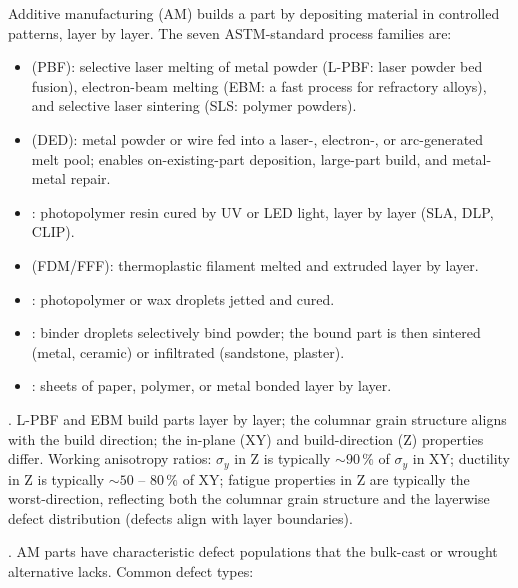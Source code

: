 Additive manufacturing (AM) builds a part by depositing material in
controlled patterns, layer by layer. The seven ASTM-standard process
families \cite[ch.~3]{text:gibson-rosen-stucker-am} are:

\begin{itemize}[leftmargin=*]
\item {} (PBF): selective laser melting of
  metal powder (L-PBF: laser powder bed fusion), electron-beam
  melting (EBM: a fast process for refractory alloys), and selective
  laser sintering (SLS: polymer powders).
\item {} (DED): metal powder or
  wire fed into a laser-, electron-, or arc-generated melt pool;
  enables on-existing-part deposition, large-part build, and metal-
  metal repair.
\item {}: photopolymer resin cured by
  UV or LED light, layer by layer (SLA, DLP, CLIP).
\item {} (FDM/FFF): thermoplastic filament
  melted and extruded layer by layer.
\item {}: photopolymer or wax droplets jetted
  and cured.
\item {}: binder droplets selectively bind
  powder; the bound part is then sintered (metal, ceramic) or
  infiltrated (sandstone, plaster).
\item {}: sheets of paper, polymer, or
  metal bonded layer by layer.
\end{itemize}

. L-PBF and
EBM build parts layer by layer; the columnar grain structure aligns
with the build direction; the in-plane (XY) and build-direction (Z)
properties differ. Working anisotropy ratios: $\sigma_y$ in Z is
typically $\sim 90\,\%$ of $\sigma_y$ in XY; ductility in Z is
typically $\sim 50$ -- $80\,\%$ of XY; fatigue properties in Z are
typically the worst-direction, reflecting both the columnar grain
structure and the layerwise defect distribution (defects align with
layer boundaries).

. AM parts have characteristic defect populations
that the bulk-cast or wrought alternative lacks. Common defect
types:

